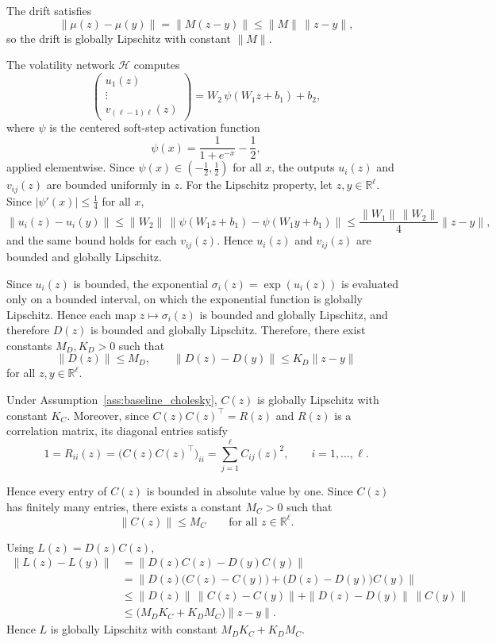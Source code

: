 \begin{description}[
    style=unboxed,
    leftmargin=0pt,
    labelindent=0pt,
    labelsep=0.5em
]

\item[Drift.]
The drift satisfies
\[
\|\mu(z)-\mu(y)\|
=
\|M(z-y)\|
\leq
\|M\|\,\|z-y\|,
\]
so the drift is globally Lipschitz with constant $\|M\|$.

\item[Diffusion.]
The volatility network $\mathcal{H}$ computes
\[
\begin{pmatrix} u_1(z) \\ \vdots \\ v_{(\ell-1)\ell}(z) \end{pmatrix}
=
W_2\,\psi(W_1 z + b_1) + b_2,
\]
where $\psi$ is the centered soft-step activation function
\[
\psi(x)=\frac{1}{1+e^{-x}}-\frac{1}{2},
\]
applied elementwise. Since $\psi(x)\in(-\tfrac{1}{2}, \tfrac{1}{2})$ for all $x$, the outputs $u_i(z)$ and $v_{ij}(z)$ are bounded uniformly in $z$. For the Lipschitz property, let $z,y\in\mathbb{R}^\ell$. Since $|\psi'(x)|\leq\tfrac{1}{4}$ for all $x$,
\[
\|u_i(z)-u_i(y)\|
\leq
\|W_2\|\,\|\psi(W_1 z+b_1)-\psi(W_1 y+b_1)\|
\leq
\frac{\|W_1\|\,\|W_2\|}{4}\|z-y\|,
\]
and the same bound holds for each $v_{ij}(z)$. Hence $u_i(z)$ and $v_{ij}(z)$ are bounded and globally Lipschitz.

Since $u_i(z)$ is bounded, the exponential $\sigma_i(z)=\exp(u_i(z))$ is evaluated only on a bounded interval, on which the exponential function is globally Lipschitz. Hence each map $z\mapsto\sigma_i(z)$ is bounded and globally Lipschitz, and therefore $D(z)$ is bounded and globally Lipschitz. Therefore, there exist constants \(M_D,K_D>0\) such that \[ \|D(z)\|\leq M_D, \qquad \|D(z)-D(y)\|\leq K_D\|z-y\| \] for all \(z,y\in\mathbb{R}^{\ell}\).

Under Assumption~\ref{ass:baseline_cholesky}, \(C(z)\) is globally Lipschitz with constant \(K_C\). Moreover, since \(C(z)C(z)^\top=R(z)\) and \(R(z)\) is a correlation matrix, its diagonal entries satisfy 
\[ 
1 = R_{ii}(z) 
= \bigl(C(z)C(z)^\top\bigr)_{ii} 
= \sum_{j=1}^{\ell} C_{ij}(z)^2, \qquad i=1,\ldots,\ell. 
\] 

Hence every entry of \(C(z)\) is bounded in absolute value by one. Since \(C(z)\) has finitely many entries, there exists a constant \(M_C>0\) such that 
\[ 
\|C(z)\|\leq M_C 
\qquad 
\text{for all } z\in\mathbb{R}^{\ell}. 
\]

Using
$L(z)=D(z)C(z)$,
\[
\begin{aligned}
\|L(z)-L(y)\|
&=
\|D(z)C(z)-D(y)C(y)\| \\
&=
\bigl\|D(z)\bigl(C(z)-C(y)\bigr)
+\bigl(D(z)-D(y)\bigr)C(y)\bigr\| \\
&\leq
\|D(z)\|\,\|C(z)-C(y)\|
+\|D(z)-D(y)\|\,\|C(y)\| \\
&\leq
\bigl(M_DK_C+K_DM_C\bigr)\|z-y\|.
\end{aligned}
\]
Hence $L$ is globally Lipschitz with constant
$M_DK_C+K_DM_C$.


\end{description}

